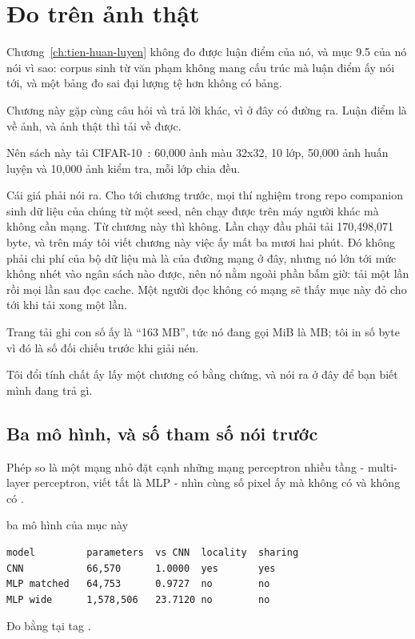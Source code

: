 \section{Đo trên ảnh thật}
\label{sec:ch10-anh-that}

%
Chương~\ref{ch:tien-huan-luyen} không đo được luận điểm của nó, và mục 9.5 của
nó nói vì sao: corpus sinh từ văn phạm không mang cấu trúc mà luận điểm ấy nói
tới, và một bảng đo sai đại lượng tệ hơn không có bảng.

Chương này gặp cùng câu hỏi và trả lời khác, vì ở đây có đường ra. Luận điểm là
về ảnh, và ảnh thật thì tải về được.

Nên sách này tải CIFAR-10~\autocite{krizhevsky2009cifar}: 60,000 ảnh màu
32x32, 10 lớp, 50,000 ảnh huấn luyện và 10,000 ảnh kiểm tra, mỗi lớp chia đều.

Cái giá phải nói ra. Cho tới chương trước, mọi thí nghiệm trong repo companion
sinh dữ liệu của chúng từ một seed, nên  chạy được trên máy
người khác mà không cần mạng. Từ chương này thì không. Lần chạy đầu phải tải
170,498,071 byte, và trên máy tôi viết chương này việc ấy mất ba mươi hai phút.
Đó không phải chi phí của bộ dữ liệu mà là của đường mạng ở đây, nhưng nó lớn
tới mức không nhét vào ngân sách nào được, nên nó nằm ngoài phần bấm giờ: tải
một lần rồi mọi lần sau đọc cache. Một người đọc không có mạng sẽ thấy mục này
đỏ cho tới khi tải xong một lần.

Trang tải ghi con số ấy là \enquote{163 MB}, tức nó đang gọi MiB là MB; tôi in
số byte vì đó là số  đối chiếu trước khi giải nén.

Tôi đổi tính chất ấy lấy một chương có bằng chứng, và nói ra ở đây để bạn biết
mình đang trả gì.

\subsection*{Ba mô hình, và số tham số nói trước}

%
Phép so là một mạng  nhỏ đặt cạnh những mạng
perceptron nhiều tầng - multi-layer perceptron, viết tắt là MLP - nhìn cùng số
pixel ấy mà không có  và không có
.

\begin{measured}{ba mô hình của mục này}
\begin{verbatim}
model         parameters  vs CNN  locality  sharing
CNN           66,570      1.0000  yes       yes
MLP matched   64,753      0.9727  no        no
MLP wide      1,578,506   23.7120 no        no
\end{verbatim}

Đo bằng  tại tag .
\end{measured}

